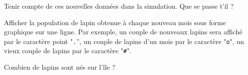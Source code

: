 \begin{lastenu}
  \item Tenir compte de ces nouvelles données dans la simulation. Que
    se passe t'il ?
\item Afficher la population de lapin obtenue à chaque nouveau mois
  sous forme graphique sur une ligne. Par exemple, un couple de
  nouveaux lapins sera affiché par le caractère point "\verb+.+'', un couple de lapins d'un
  mois par le caractère "\verb+o+", un vieux couple de lapins par le
  caractère "\verb+#+".
\item Combien de lapins sont nés sur l'île ?
\end{lastenu}

\begin{correction}
  \begin{small}
    
    \end{small}
\end{correction}

